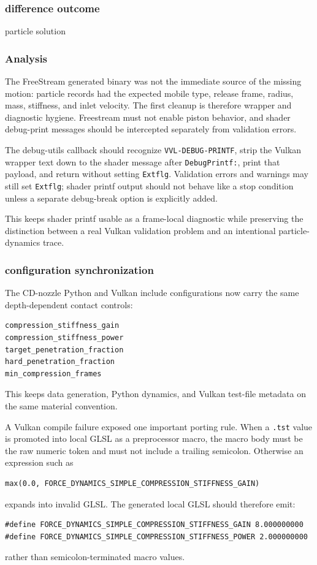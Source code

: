 \subsubsection{difference outcome}

particle solution

\subsubsection{Analysis}

The FreeStream generated binary was not the immediate source of the missing
motion: particle records had the expected mobile type, release frame, radius,
mass, stiffness, and inlet velocity.  The first cleanup is therefore wrapper
and diagnostic hygiene.  Freestream must not enable piston behavior, and
shader debug-print messages should be intercepted separately from validation
errors.

The debug-utils callback should recognize \texttt{VVL-DEBUG-PRINTF}, strip
the Vulkan wrapper text down to the shader message after
\texttt{DebugPrintf:}, print that payload, and return without setting
\texttt{Extflg}.  Validation errors and warnings may still set
\texttt{Extflg}; shader printf output should not behave like a stop
condition unless a separate debug-break option is explicitly added.

This keeps shader printf usable as a frame-local diagnostic while preserving
the distinction between a real Vulkan validation problem and an intentional
particle-dynamics trace.

\subsubsection{configuration synchronization}

The CD-nozzle Python and Vulkan include configurations now carry the same
depth-dependent contact controls:
\begin{verbatim}
compression_stiffness_gain
compression_stiffness_power
target_penetration_fraction
hard_penetration_fraction
min_compression_frames
\end{verbatim}
This keeps data generation, Python dynamics, and Vulkan test-file metadata on
the same material convention.

A Vulkan compile failure exposed one important porting rule.  When a
\texttt{.tst} value is promoted into local GLSL as a preprocessor macro, the
macro body must be the raw numeric token and must not include a trailing
semicolon.  Otherwise an expression such as
\begin{verbatim}
max(0.0, FORCE_DYNAMICS_SIMPLE_COMPRESSION_STIFFNESS_GAIN)
\end{verbatim}
expands into invalid GLSL.  The generated local GLSL should therefore emit:
\begin{verbatim}
#define FORCE_DYNAMICS_SIMPLE_COMPRESSION_STIFFNESS_GAIN 8.000000000
#define FORCE_DYNAMICS_SIMPLE_COMPRESSION_STIFFNESS_POWER 2.000000000
\end{verbatim}
rather than semicolon-terminated macro values.

